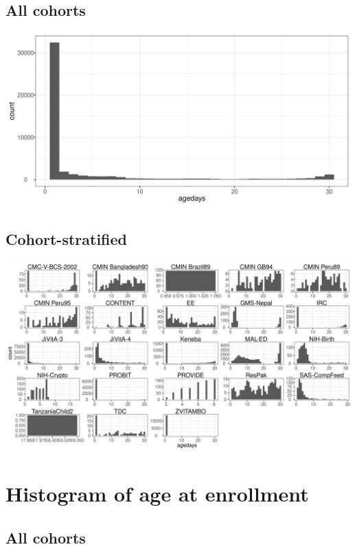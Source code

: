 \documentclass[
  9pt,
]{book}
\begin{document}
\hypertarget{all-cohorts}{%
\subsection{All cohorts}\label{all-cohorts}}

\includegraphics[width=33.33in]{figures//shared/age_histogram_first_month}

\hypertarget{cohort-stratified}{%
\subsection{Cohort-stratified}\label{cohort-stratified}}

\includegraphics[width=45.83in]{figures//shared/age_histogram_first_month_cohort}

\hypertarget{histogram-of-age-at-enrollment}{%
\section{Histogram of age at enrollment}\label{histogram-of-age-at-enrollment}}

\hypertarget{all-cohorts-1}{%
\subsection{All cohorts}\label{all-cohorts-1}}
\end{document}
